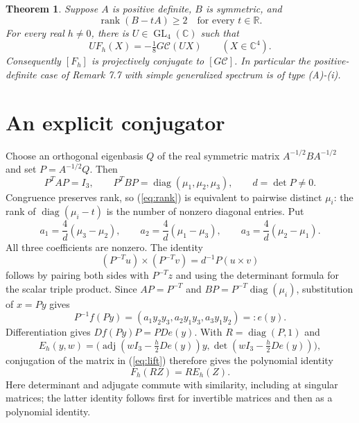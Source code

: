 \documentclass[11pt]{article}
\newtheorem{theorem}{Theorem}
\newcommand{\C}{\mathbb C}
\newcommand{\R}{\mathbb R}
\newcommand{\adj}{\operatorname{adj}}
\newcommand{\diag}{\operatorname{diag}}
\newcommand{\Cr}{\mathcal C}
\begin{document}
\begin{theorem}\label{thm:main}
Suppose $A$ is positive definite, $B$ is symmetric, and
\begin{equation}\label{eq:rank}
 \operatorname{rank}(B-tA)\ge2\quad\text{for every }t\in\R.
\end{equation}
For every real $h\ne0$, there is $U\in\operatorname{GL}_4(\C)$ such that
\begin{equation}\label{eq:normal}
 U F_h(X)=-\tfrac18 G\Cr(UX)\qquad(X\in\C^4).
\end{equation}
Consequently $[F_h]$ is projectively conjugate to $[G\Cr]$.
In particular the positive-definite case of Remark 7.7 with simple generalized
spectrum is of type (A)-(i).
\end{theorem}

\section{An explicit conjugator}
Choose an orthogonal eigenbasis $Q$ of the real symmetric matrix
$A^{-1/2}BA^{-1/2}$ and set $P=A^{-1/2}Q$. Then
\[
 P^TAP=I_3,\qquad P^TBP=\diag(\mu_1,\mu_2,\mu_3),\qquad d=\det P\ne0.
\]
Congruence preserves rank, so (\ref{eq:rank}) is equivalent to pairwise
distinct $\mu_i$: the rank of $\diag(\mu_i-t)$ is the number of nonzero
diagonal entries. Put
\begin{equation}\label{eq:a}
 a_1=\frac4d(\mu_3-\mu_2),\qquad
 a_2=\frac4d(\mu_1-\mu_3),\qquad
 a_3=\frac4d(\mu_2-\mu_1).
\end{equation}
All three coefficients are nonzero. The identity
\begin{equation}\label{eq:cross}
 (P^{-T}u)\times(P^{-T}v)=d^{-1}P(u\times v)
\end{equation}
follows by pairing both sides with $P^{-T}z$ and using the determinant formula
for the scalar triple product. Since $AP=P^{-T}$ and
$BP=P^{-T}\diag(\mu_i)$, substitution of $x=Py$ gives
\[
 P^{-1}f(Py)=(a_1y_2y_3,a_2y_1y_3,a_3y_1y_2)=:e(y).
\]
Differentiation gives $Df(Py)P=PDe(y)$. With $R=\diag(P,1)$ and
\[
 E_h(y,w)=\bigl(\adj(wI_3-\tfrac h2 De(y))y,
                    \det(wI_3-\tfrac h2 De(y))\bigr),
\]
conjugation of the matrix in (\ref{eq:lift}) therefore gives the polynomial
identity
\begin{equation}\label{eq:cov}
 F_h(RZ)=R E_h(Z).
\end{equation}
Here determinant and adjugate commute with similarity, including at singular
matrices; the latter identity follows first for invertible matrices and then
as a polynomial identity.
\end{document}

